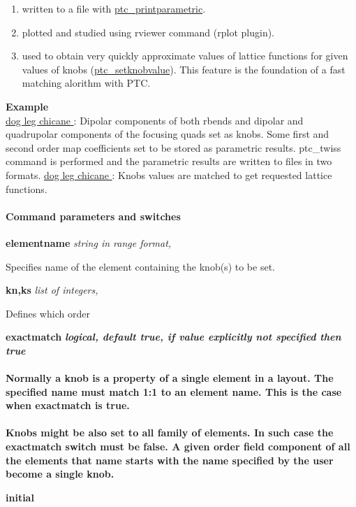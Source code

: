 \begin{enumerate}
	\item  written to a file with \href{PTC_PrintParametric.html}{ptc\_printparametric}.
	\item  plotted and studied using rviewer command (rplot plugin). 
	\item  used to obtain very quickly approximate values of lattice functions for given values of knobs     (\href{PTC_SetKnobValue.html}{ptc\_setknobvalue}).     This feature is the foundation of a fast matching alorithm with PTC.     
\end{enumerate}

\textbf{ Example }\\

\href{http://cern.ch/frs/mad-X_examples/ptc_madx_interface/knobs/knobs.madx}{ dog leg chicane  } : Dipolar components of both rbends and dipolar and quadrupolar components of the focusing quads set as knobs. Some first and second order map coefficients set to be stored as parametric results. ptc\_twiss command is performed and the parametric results are written to files in two formats.  \href{http://cern.ch/frs/mad-X_examples/ptc_madx_interface/matchknobs/matchknobs.madx}{ dog leg chicane  } : Knobs values are matched to get requested lattice functions.

\paragraph{ Command parameters and switches }
\begin{description}
	\item \textbf{ elementname } \textit{ string in range format, }

 Specifies name of the element containing the knob(s) to be set.   
	\item \textbf{ kn,ks } \textit{ list of integers,   }

 Defines which order    
	\item \textbf{ exactmatch }
    \textbf{\textit{ logical, default true, if value explicitly not specified then true}\\\\
 Normally a knob is a property of a single element in a layout.        The specified name must match 1:1 to an element name. This is the case       when exactmatch is true.\\\\ 
 Knobs might be also set to all family of elements. In such case        the exactmatch switch must be false. A given order field component of all the elements        that name starts with the name specified by the user become a single knob.   }
	\item \textbf{initial}
\end{description}

